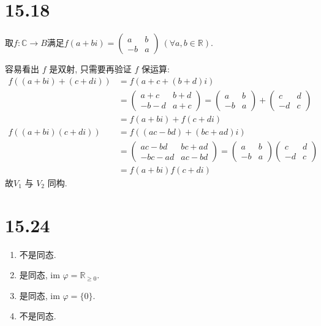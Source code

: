 \documentclass[8pt]{article}
\theoremstyle{compact}
\def\ge{\geqslant}
\def\im{\text{im }}
\begin{document}
\section*{15.18}
取$f: \mathbb C \to B$满足$f(a + bi) = \begin{pmatrix}
	a&b\\-b&a
\end{pmatrix}\ (\forall a, b \in \mathbb R)$.

容易看出 $f$ 是双射, 只需要再验证 $f$ 保运算:
\begin{align*}
	f((a + bi) + (c + di)) &= f(a + c + (b + d)i) \\&= \begin{pmatrix}
		a+c&b+d\\-b-d&a+c
	\end{pmatrix} = \begin{pmatrix}
		a&b\\-b&a
	\end{pmatrix} + \begin{pmatrix}
		c&d\\-d&c
	\end{pmatrix} \\&= f(a + bi) + f(c + di)\\
	f((a + bi)(c + di)) &= f((ac-bd) + (bc+ad)i) \\&= \begin{pmatrix}
		ac-bd & bc + ad \\ -bc - ad & ac - bd
	\end{pmatrix} = \begin{pmatrix}
		a&b\\-b&a
	\end{pmatrix} \begin{pmatrix}
		c&d\\-d&c
	\end{pmatrix} \\&= f(a + bi)f(c + di)
\end{align*}
故$V_1$ 与 $V_2$ 同构.
\section*{15.24}

\begin{enumerate}
	\item 不是同态.
	\item 是同态, $\im \varphi = \mathbb R_{\ge 0}$.
	\item 是同态, $\im \varphi = \{0\}$.
	\item 不是同态.
\end{enumerate}
\end{document}
